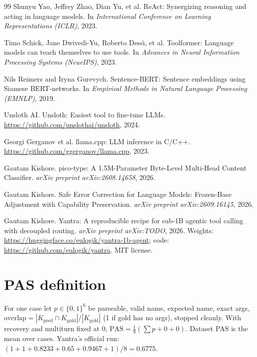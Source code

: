 \documentclass[11pt]{article}
\begin{document}
\begin{thebibliography}{99}
Shunyu Yao, Jeffrey Zhao, Dian Yu, et al.
\newblock ReAct: Synergizing reasoning and acting in language models.
\newblock In \emph{International Conference on Learning Representations
  (ICLR)}, 2023.

Timo Schick, Jane Dwivedi-Yu, Roberto Dess{\`\i}, et al.
\newblock Toolformer: Language models can teach themselves to use tools.
\newblock In \emph{Advances in Neural Information Processing Systems
  (NeurIPS)}, 2023.

Nils Reimers and Iryna Gurevych.
\newblock Sentence-BERT: Sentence embeddings using Siamese BERT-networks.
\newblock In \emph{Empirical Methods in Natural Language Processing
  (EMNLP)}, 2019.

Unsloth AI.
\newblock Unsloth: Easiest tool to fine-tune LLMs.
\newblock \url{https://github.com/unslothai/unsloth}, 2024.

Georgi Gerganov et al.
\newblock llama.cpp: LLM inference in C/C++.
\newblock \url{https://github.com/ggerganov/llama.cpp}, 2023.

Gautam Kishore.
\newblock pico-type: A 1.5M-Parameter Byte-Level Multi-Head Content Classifier.
\newblock \emph{arXiv preprint arXiv:2608.14658}, 2026.

Gautam Kishore.
\newblock Safe Error Correction for Language Models: Frozen-Base Adjustment with
  Capability Preservation.
\newblock \emph{arXiv preprint arXiv:2609.16145}, 2026.

Gautam Kishore.
\newblock Yantra: A reproducible recipe for sub-1B agentic tool
  calling with decoupled routing.
\newblock \emph{arXiv preprint arXiv:TODO}, 2026.
\newblock Weights: \url{https://huggingface.co/eulogik/yantra-1b-agent};
  code: \url{https://github.com/eulogik/yantra}. MIT license.

\end{thebibliography}

\appendix

\section{PAS definition}
\label{app:pas}

For one case let $p \in \{0,1\}^6$ be parseable, valid name, expected
name, exact args, $\mathrm{overlap} = |K_{\mathrm{pred}} \cap
K_{\mathrm{gold}}| / |K_{\mathrm{gold}}|$ (1 if gold has no args),
stopped cleanly. With recovery and multiturn fixed at 0,
$\mathrm{PAS} = \frac{1}{8}(\sum p + 0 + 0)$.
Dataset PAS is the mean over cases. Yantra's official run:
$(1 + 1 + 0.8233 + 0.65 + 0.9467 + 1)/8 = 0.6775$.
\end{document}
